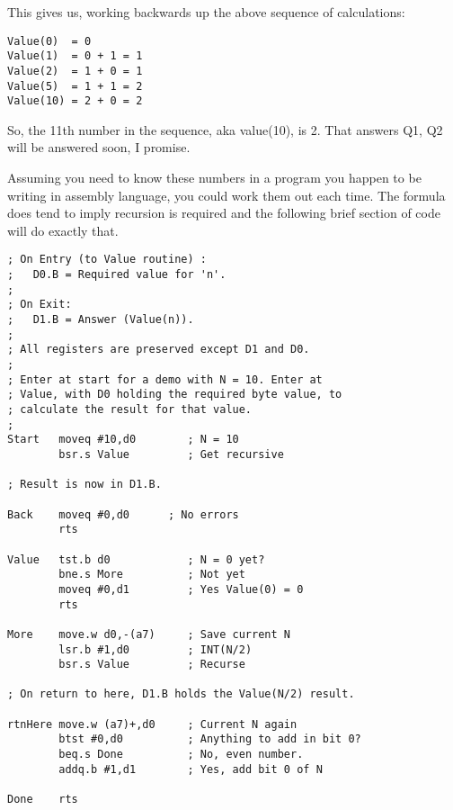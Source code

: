 This gives us, working backwards up the above sequence of calculations:

\begin{lstlisting}[numbers=none]
Value(0)  = 0
Value(1)  = 0 + 1 = 1
Value(2)  = 1 + 0 = 1
Value(5)  = 1 + 1 = 2
Value(10) = 2 + 0 = 2
\end{lstlisting}

So, the 11th number in the sequence, aka value(10), is 2. That answers
Q1, Q2 will be answered soon, I promise.

Assuming you need to know these numbers in a program you happen to
be writing in assembly language, you could work them out each time.
The formula does tend to imply recursion is required and the following
brief section of code will do exactly that.

\begin{lstlisting}[caption={Calculating values with recursion}]
; On Entry (to Value routine) : 
;   D0.B = Required value for 'n'. 
; 
; On Exit: 
;   D1.B = Answer (Value(n)). 
; 
; All registers are preserved except D1 and D0.
;
; Enter at start for a demo with N = 10. Enter at
; Value, with D0 holding the required byte value, to
; calculate the result for that value.
;
Start   moveq #10,d0        ; N = 10
        bsr.s Value         ; Get recursive

; Result is now in D1.B.

Back    moveq #0,d0		 ; No errors
        rts

Value   tst.b d0            ; N = 0 yet?
        bne.s More          ; Not yet
        moveq #0,d1         ; Yes Value(0) = 0
        rts

More    move.w d0,-(a7)     ; Save current N
        lsr.b #1,d0         ; INT(N/2)
        bsr.s Value         ; Recurse

; On return to here, D1.B holds the Value(N/2) result.

rtnHere move.w (a7)+,d0     ; Current N again
        btst #0,d0          ; Anything to add in bit 0?
        beq.s Done          ; No, even number.
        addq.b #1,d1        ; Yes, add bit 0 of N

Done    rts 
\end{lstlisting}

